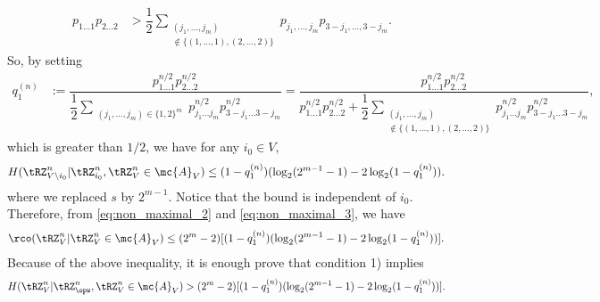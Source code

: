 \begin{align*}
    p_{1\ldots 1}p_{2\ldots 2}& >  \dfrac{1}{2}\sum \limits_{\substack{(j_1,\ldots,j_m)\\ \not\in \{(1,\ldots,1),(2,\ldots,2)\}}}p_{j_1, \ldots, j_m}p_{3-j_1,\ldots, 3-j_m}. %
\end{align*}
So, by setting 
 \begin{align*}
     q^{(n)}_1 &:= \dfrac{p_{1\ldots 1}^{n/2}p_{2\ldots 2}^{n/2}}{\dfrac{1}{2}\sum \limits_{\substack{(j_1,\ldots,j_m)\in \{1,2\}^m}}p_{j_1\ldots j_m}^{n/2}p_{3-j_1\ldots 3-j_m}^{n/2}}= \dfrac{p_{1\ldots 1}^{n/2}p_{2\ldots 2}^{n/2}}{p_{1\ldots 1}^{n/2}p_{2\ldots 2}^{n/2}+\dfrac{1}{2}\sum \limits_{\substack{(j_1,\ldots,j_m)\\ \not\in \{(1,\ldots,1),(2,\ldots,2)\}}}p_{j_1\ldots j_m}^{n/2}p_{3-j_1\ldots 3-j_m}^{n/2}},
 \end{align*} 
 which is greater than $1/2$, we have for any $i_0 \in V$, 
 \begin{align}\label{eq:non_maximal_3}
    &H(\tRZ^n_{V \backslash i_0}|\tRZ^n_{i_0},\tRZ^n_V\in \mc{A}_{V})%
    \leq (1-q^{(n)}_1)(\log_2 (2^{m-1}-1) - 2\log_2 (1-q^{(n)}_1)).
\end{align}
where we replaced $s$ by $2^{m-1}$. Notice that the bound is independent of $i_0$. Therefore, from \eqref{eq:non_maximal_2} and \eqref{eq:non_maximal_3}, we have 
\begin{align*}
 &\rco(\tRZ^n_V|\tRZ^n_V\in \mc{A}_{V})%
 \leq (2^{m}-2)[(1-q^{(n)}_1)(\log_2 (2^{m-1}-1) - 2\log_2 (1-q^{(n)}_1))].\notag
\end{align*}
Because of the above inequality, it is enough prove that condition 1) implies 
\begin{align}\label{eq:final}
 &H(\tRZ^n_V|\tRZ^n_{\opw},\tRZ^n_V\in \mc{A}_{V})%
 > (2^{m}-2)[(1-q^{(n)}_1)(\log_2 (2^{m-1}-1) - 2\log_2 (1-q^{(n)}_1))].%
\end{align}


